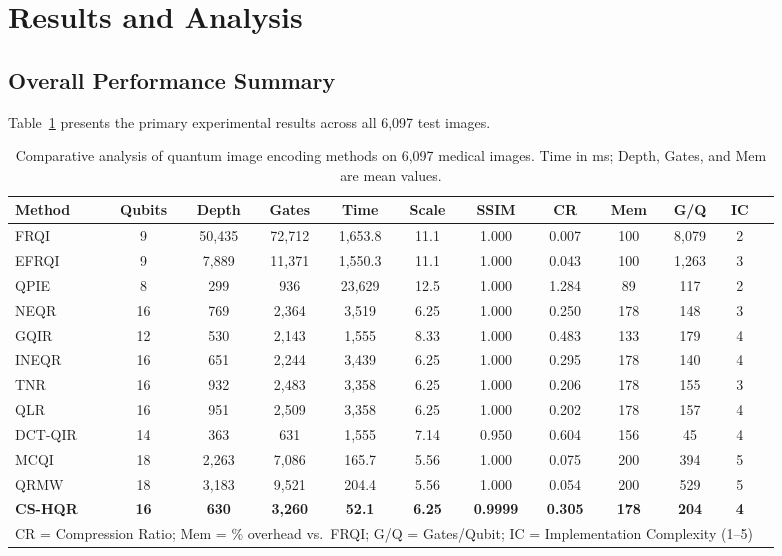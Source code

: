 \documentclass{ipol}
\newcommand{\cshqr}{\textsc{CS-HQR}}
\newcommand{\mcqi}{\textsc{MCQI}}
\begin{document}
\FloatBarrier
\section{Results and Analysis}
\label{sec:results}

\FloatBarrier
\subsection{Overall Performance Summary}

Table~\ref{tab:main_results} presents the primary experimental results across
all 6,097 test images.

\begin{table}[H]
\begin{center}
\small
\begin{tabular}{lccccccccccc}
\hline
Method & Qubits & Depth & Gates & Time & Scale & SSIM & CR & Mem & G/Q & IC \\
\hline
FRQI   & 9  & 50,435 & 72,712 & 1,653.8 & 11.1 & 1.000 & 0.007 & 100 & 8,079 & 2 \\
EFRQI  & 9  & 7,889  & 11,371 & 1,550.3 & 11.1 & 1.000 & 0.043 & 100 & 1,263 & 3 \\
QPIE   & 8  & 299    & 936    & 23,629  & 12.5 & 1.000 & 1.284 & 89  & 117   & 2 \\
NEQR   & 16 & 769    & 2,364  & 3,519   & 6.25 & 1.000 & 0.250 & 178 & 148   & 3 \\
GQIR   & 12 & 530    & 2,143  & 1,555   & 8.33 & 1.000 & 0.483 & 133 & 179   & 4 \\
INEQR  & 16 & 651    & 2,244  & 3,439   & 6.25 & 1.000 & 0.295 & 178 & 140   & 4 \\
TNR    & 16 & 932    & 2,483  & 3,358   & 6.25 & 1.000 & 0.206 & 178 & 155   & 3 \\
QLR    & 16 & 951    & 2,509  & 3,358   & 6.25 & 1.000 & 0.202 & 178 & 157   & 4 \\
DCT-QIR& 14 & 363    & 631    & 1,555   & 7.14 & 0.950 & 0.604 & 156 & 45    & 4 \\
\mcqi  & 18 & 2,263  & 7,086  & 165.7   & 5.56 & 1.000 & 0.075 & 200 & 394   & 5 \\
QRMW   & 18 & 3,183  & 9,521  & 204.4   & 5.56 & 1.000 & 0.054 & 200 & 529   & 5 \\
\rowcolor{green!15}
\textbf{\cshqr} & \textbf{16} & \textbf{630} & \textbf{3,260} & \textbf{52.1}
  & \textbf{6.25} & \textbf{0.9999} & \textbf{0.305} & \textbf{178} & \textbf{204} & \textbf{4} \\
\hline
\multicolumn{11}{l}{\footnotesize CR = Compression Ratio; Mem = \% overhead vs.\ FRQI; G/Q = Gates/Qubit; IC = Implementation Complexity (1--5)}
\end{tabular}
\caption{Comparative analysis of quantum image encoding methods on 6,097
  medical images. Time in ms; Depth, Gates, and Mem are mean values.}
\label{tab:main_results}
\end{center}
\end{table}
\end{document}
